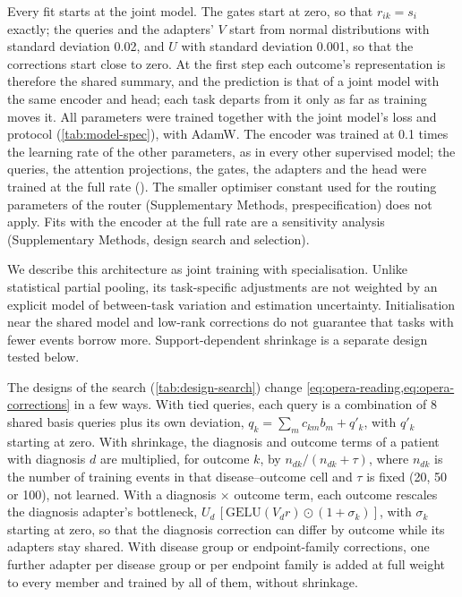 Every fit starts at the joint model. The gates start at zero, so that
$r_{ik}=s_i$ exactly; the queries and the adapters' $V$ start from normal
distributions with standard deviation 0.02, and $U$ with standard deviation
0.001, so that the corrections start close to zero. At the first step each
outcome's representation is therefore the shared summary, and the prediction is
that of a joint model with the same encoder and head; each task departs from it
only as far as training moves it. All parameters were trained together with the
joint model's loss and protocol (\cref{tab:model-spec}), with AdamW. The
encoder was trained at 0.1 times the learning rate of the other parameters, as
in every other supervised model; the queries, the attention projections, the
gates, the adapters and the head were trained at the full rate
(). The smaller optimiser constant used for the
routing parameters of the router (Supplementary Methods, prespecification) does
not apply. Fits with the encoder at the full rate are a sensitivity analysis
(Supplementary Methods, design search and selection). 

We describe this architecture as joint training with specialisation. Unlike
statistical partial pooling, its task-specific adjustments are not weighted by
an explicit model of between-task variation and estimation uncertainty.
Initialisation near the shared model and low-rank corrections do not guarantee
that tasks with fewer events borrow more. Support-dependent shrinkage is a
separate design tested below.

The designs of the search (\cref{tab:design-search}) change
\cref{eq:opera-reading,eq:opera-corrections} in a few ways. With tied queries,
each query is a combination of 8 shared basis queries plus its own deviation,
$q_k=\sum_m c_{km}b_m+q'_k$, with $q'_k$ starting at zero. With shrinkage, the
diagnosis and outcome terms of a patient with diagnosis $d$ are multiplied, for
outcome $k$, by $n_{dk}/(n_{dk}+\tau)$, where $n_{dk}$ is the number of training
events in that disease--outcome cell and $\tau$ is fixed (20, 50 or 100), not
learned. With a diagnosis $\times$ outcome term, each outcome rescales the
diagnosis adapter's bottleneck, $U_d\,[\mathrm{GELU}(V_d r)\odot(1+\sigma_k)]$,
with $\sigma_k$ starting at zero, so that the diagnosis correction can differ by
outcome while its adapters stay shared. With disease group or endpoint-family
corrections, one further adapter per disease group or per endpoint family is added at
full weight to every member and trained by all of them, without shrinkage.

